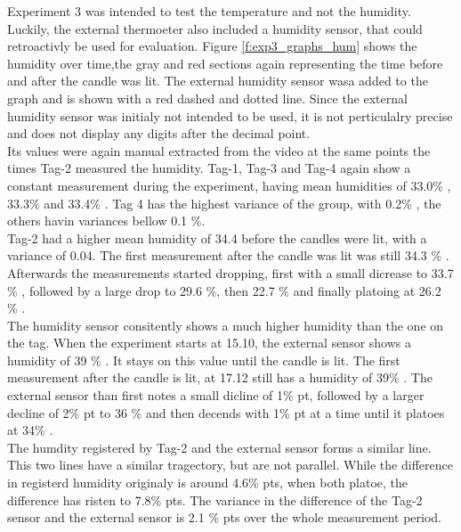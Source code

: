 Experiment 3 was intended to test the temperature and not the humidity.
Luckily, the external thermoeter also included a humidity sensor, that could retroactivly be used for evaluation.
Figure \ref{f:exp3_graphs_hum} shows the humidity over time,the gray and red sections again representing the time before and after the candle was lit.
The external humidity sensor wasa added to the graph and is shown with a red dashed and dotted line.
Since the external humidity sensor was initialy not intended to be used, it is not perticulalry precise and does not display any digits after the decimal point.\\
Its values were again manual extracted from the video at the same points the times Tag-2 measured the humidity.
Tag-1, Tag-3 and Tag-4 again show a constant measurement during the experiment, having mean humidities of 33.0\% , 33.3\% and 33.4\% .
Tag 4 has the highest variance of the group, with 0.2\% , the others havin variances bellow 0.1 \%.\\
Tag-2 had a higher mean humidity of 34.4 before the candles were lit, with a variance of 0.04.
The first measurement after the candle was lit was still 34.3 \% . Afterwards the measurements started dropping, first with a small dicrease to 33.7 \% , followed by a large drop to 29.6 \%, then 22.7 \% and finally platoing at 26.2 \% .\\
The humidity sensor consitently shows a much higher humidity than the one on the tag.
When the experiment starts at 15.10, the external sensor shows a humidity of 39 \% .
It stays on this value until the candle is lit.
The first measurement after the candle is lit, at 17.12 still has a humidity of 39\% .
The external sensor than first notes a small dicline of 1\% pt, followed by a larger decline of 2\% pt to 36 \% and then decends with 1\% pt at a time until it platoes at 34\% . \\
The humdity registered by Tag-2 and the external sensor forms a similar line.
This two lines have a similar tragectory, but are not parallel.
While the difference in registerd humidity originaly is around 4.6\% pts, when both platoe, the difference has risten to 7.8\% pts.
The variance in the difference of the Tag-2 sensor and the external sensor is 2.1 \% pts over the whole measurement period.

